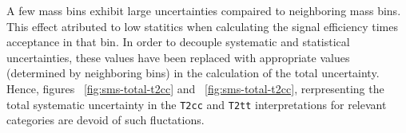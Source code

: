 A few mass bins exhibit large uncertainties compaired to neighboring 
mass bins.  This effect atributed to low statitics when calculating the signal
efficiency times acceptance in that bin. In order to decouple systematic
and statistical uncertainties, these values have been replaced with appropriate 
values (determined by neighboring bins) in the calculation of the
total uncertainty. Hence, figures ~\ref{fig:sms-total-t2cc} and
~\ref{fig:sms-total-t2cc}, rerpresenting the total
systematic uncertainty in the \verb!T2cc! and \verb!T2tt! interpretations
for relevant categories are devoid of such fluctations.

\begin{figure}[h!]
  \begin{center}
    \\                                                                
\end{center}
\end{figure}
